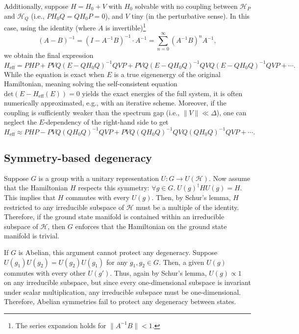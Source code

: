 \documentclass{article}
\newcommand{\hilbert}{\mathcal{H}}
\newcommand{\Heff}{H_{\mathrm{eff}}}
\begin{document}
Additionally, suppose $H = H_0 + V$ with $H_0$ solvable
with no coupling between $\hilbert_P$ and $\hilbert_Q$ (i.e., $PH_0Q = QH_0P=0$),
and $V$ tiny (in the perturbative sense).
In this case, using the identity (where $A$ is invertible)\footnote{%
    The series expansion holds for $\lVert A^{-1} B \rVert < 1$.
}
\[
    \left(A-B\right)^{-1} = \left(I - A^{-1}B\right)^{-1} \cdot A^{-1}
    = \sum_{n=0}^\infty \left(A^{-1}B\right)^n A^{-1},
\]
we obtain the final expression
\[
    \Heff = PHP + PVQ (E-QH_0Q)^{-1} QVP + PVQ (E-QH_0Q)^{-1} QVQ (E-QH_0Q)^{-1} QVP + \cdots.
\]
While the equation is exact when $E$ is a true eigenenergy of the original Hamiltonian,
meaning solving the self-consistent equation $\mathrm{det} \left( E - \Heff(E)\right) = 0$
yields the exact energies of the full system,
it is often numerically approximated, e.g., with an iterative scheme.
Moreover, if the coupling is sufficiently weaker than the spectrum gap
(i.e., $\lVert V \rVert \ll \Delta$),
one can neglect the $E$-dependency of the right-hand side to get
\[
    \Heff \approx PHP - PVQ (QH_0Q)^{-1} QVP  + PVQ(QH_0Q)^{-1}QVQ(QH_0Q)^{-1}QVP + \cdots.
\]

\subsection{Symmetry-based degeneracy}\label{sec:symmetry}
Suppose $G$ is a group with a unitary representation $U: G \to U(\hilbert)$.
Now assume that the Hamiltonian $H$ respects this symmetry:
$\forall g \in G.\; U(g)^\dagger H U(g) = H$.
This implies that $H$ commutes with every $U(g)$.
Then, by Schur's lemma, $H$ restricted to any irreducible subspace of $\hilbert$
must be a multiple of the identity.
Therefore, if the ground state manifold is contained within an irreducible subspace of $\hilbert$,
then $G$ enforces that the Hamiltonian on the ground state manifold is trivial.

If $G$ is Abelian, this argument cannot protect any degeneracy.
Suppose $U(g_1)U(g_2) = U(g_2)U(g_1)$ for any $g_1, g_2 \in G$.
Then, a given $U(g)$ commutes with every other $U(g')$.
Thus, again by Schur's lemma, $U(g) \propto 1$ on any irreducible subspace,
but since every one-dimensional subspace is invariant under scalar multiplication,
any irreducible subspace must be one-dimensional.
Therefore, Abelian symmetries fail to protect any degeneracy between states.

\end{document}

